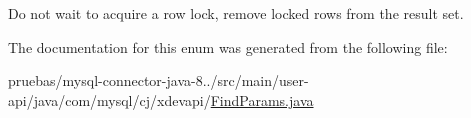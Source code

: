 Do not wait to acquire a row lock, remove locked rows from the result set. 

The documentation for this enum was generated from the following file\+:\begin{DoxyCompactItemize}
\item 
pruebas/mysql-\/connector-\/java-\/8../src/main/user-\/api/java/com/mysql/cj/xdevapi/\mbox{\hyperlink{_find_params_8java}{Find\+Params.\+java}}\end{DoxyCompactItemize}
